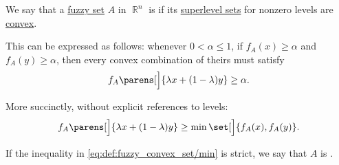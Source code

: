 \begin{definition}\label{def:fuzzy_convex_set}
  We say that a \hyperref[def:fuzzy_set]{fuzzy set} \( A \) in \( \BbbR^n \) is  if its \hyperref[def:fuzzy_level_set]{superlevel sets} for nonzero levels are \hyperref[def:convex_set]{convex}.

  This can be expressed as follows: whenever \( 0 < \alpha \leq 1 \), if \( f_A(x) \geq \alpha \) and \( f_A(y) \geq \alpha \), then every convex combination of theirs must satisfy
  \begin{equation}\label{eq:def:fuzzy_convex_set/superlevel}
    f_A\parens[\Big]{ \lambda x + (1 - \lambda) y } \geq \alpha.
  \end{equation}

  More succinctly, without explicit references to levels:
  \begin{equation}\label{eq:def:fuzzy_convex_set/min}
    f_A\parens[\Big]{ \lambda x + (1 - \lambda) y } \geq \min\set[\Big]{ f_A(x), f_A(y) }.
  \end{equation}

  If the inequality in \eqref{eq:def:fuzzy_convex_set/min} is strict, we say that \( A \) is .
\end{definition}

